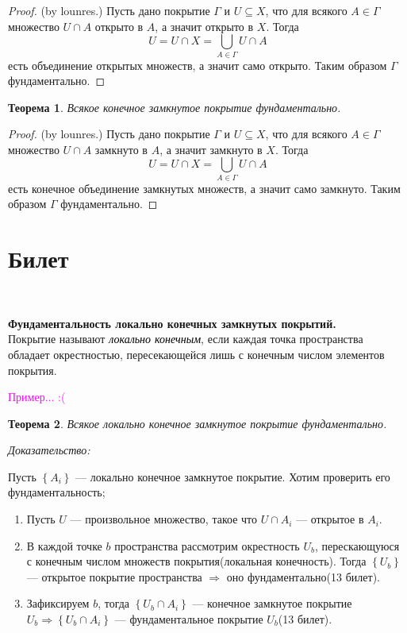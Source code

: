 \documentclass[a4paper,100pt]{article}
\theoremstyle{indented}
\newtheorem{theorem}{Теорема}
\begin{document}
\begin{proof}
    \textrm(by lounres.) Пусть дано покрытие $\Gamma$ и $U \subseteq X$, что для всякого $A \in \Gamma$ множество $U \cap A$ открыто в $A$, а значит открыто в $X$. Тогда
        \[
            U = U \cap X = \bigcup_{A \in \Gamma} U \cap A
        \]
    есть объединение открытых множеств, а значит само открыто. Таким образом $\Gamma$ фундаментально.
\end{proof}

\begin{theorem}
    Всякое конечное замкнутое покрытие фундаментально.
\end{theorem}

\begin{proof}
    \textrm(by lounres.) Пусть дано покрытие $\Gamma$ и $U \subseteq X$, что для всякого $A \in \Gamma$ множество $U \cap A$ замкнуто в $A$, а значит замкнуто в $X$. Тогда
        \[
            U = U \cap X = \bigcup_{A \in \Gamma} U \cap A
        \]
    есть конечное объединение замкнутых множеств, а значит само замкнуто. Таким образом $\Gamma$ фундаментально.
\end{proof}


\section{Билет} \

\textbf{Фундаментальность локально конечных замкнутых покрытий.}\\
    
    Покрытие называют \textit{\textcolor{black}{локально конечным}}, если каждая точка пространства обладает окрестностью, пересекающейся лишь с конечным числом элементов покрытия. 
    
    \textcolor{magenta}{Пример... :(}
    
    \begin{theorem}
        Всякое локально конечное замкнутое покрытие фундаментально.
    \end{theorem}
    \textit{Доказательство:}
    
    Пусть $\left\{A_i\right\}$ --- локально конечное замкнутое покрытие. Хотим проверить его фундаментальность;
        \begin{enumerate}
            \item Пусть $U$ --- произвольное множество, такое что $U \cap A_i$ --- открытое в $A_i$.
            \item В каждой точке $b$ пространства рассмотрим окрестность $U_b$, перескающуюся с конечным числом множеств покрытия(локальная конечность). Тогда $\left\{U_b\right\}$ --- открытое покрытие пространства $\Rightarrow$ оно фундаментально(13 билет). 
            \item Зафиксируем $b$, тогда $\left\{U_b \cap A_i\right\}$ --- конечное замкнутое покрытие $U_b \Rightarrow \left\{U_b \cap A_i\right\}$ --- фундаментальное покрытие $U_b$(13 билет).
        \end{enumerate}
        
\end{document}
